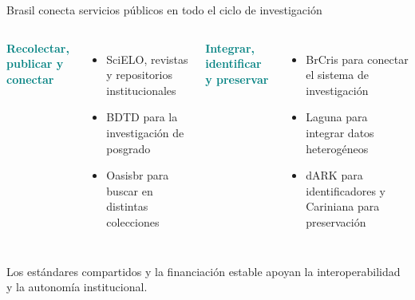 \documentclass[aspectratio=169,11pt]{beamer}
\newcommand{\tagline}[1]{\textcolor{Teal}{\bfseries\small#1}}
\begin{document}
\begin{frame}{Brasil conecta servicios públicos en todo el ciclo de investigación}
\begin{columns}[T,onlytextwidth]\tagline{Recolectar, publicar y conectar}\par\vspace{.20cm}
\begin{itemize}\setlength\itemsep{.22cm}
\item SciELO, revistas y repositorios institucionales
\item BDTD para la investigación de posgrado
\item Oasisbr para buscar en distintas colecciones
\end{itemize}
\tagline{Integrar, identificar y preservar}\par\vspace{.20cm}
\begin{itemize}\setlength\itemsep{.22cm}
\item BrCris para conectar el sistema de investigación
\item Laguna para integrar datos heterogéneos
\item dARK para identificadores y Cariniana para preservación
\end{itemize}
\end{columns}
\vfill
\begin{center}\small Los estándares compartidos y la financiación estable apoyan la interoperabilidad y la autonomía institucional.\end{center}
\end{frame}
\end{document}
